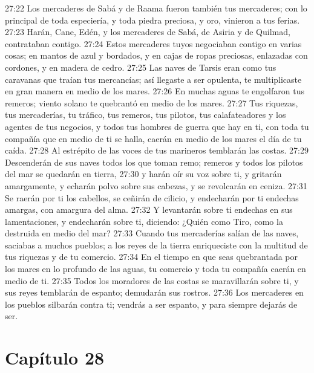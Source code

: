 27:22 Los mercaderes de Sabá y de Raama fueron también tus mercaderes; con lo principal de toda especiería, y toda piedra preciosa, y oro, vinieron a tus ferias.   
27:23 Harán, Cane, Edén, y los mercaderes de Sabá, de Asiria y de Quilmad, contrataban contigo.   
27:24 Estos mercaderes tuyos negociaban contigo en varias cosas; en mantos de azul y bordados, y en cajas de ropas preciosas, enlazadas con cordones, y en madera de cedro.   
27:25 Las naves de Tarsis eran como tus caravanas que traían tus mercancías; así llegaste a ser opulenta, te multiplicaste en gran manera en medio de los mares.   
27:26 En muchas aguas te engolfaron tus remeros; viento solano te quebrantó en medio de los mares.   
27:27 Tus riquezas, tus mercaderías, tu tráfico, tus remeros, tus pilotos, tus calafateadores y los agentes de tus negocios, y todos tus hombres de guerra que hay en ti, con toda tu compañía que en medio de ti se halla, caerán en medio de los mares el día de tu caída.   
27:28 Al estrépito de las voces de tus marineros temblarán las costas.   
27:29 Descenderán de sus naves todos los que toman remo; remeros y todos los pilotos del mar se quedarán en tierra,   
27:30 y harán oír su voz sobre ti, y gritarán amargamente, y echarán polvo sobre sus cabezas, y se revolcarán en ceniza.   
27:31 Se raerán por ti los cabellos, se ceñirán de cilicio, y endecharán por ti endechas amargas, con amargura del alma.   
27:32 Y levantarán sobre ti endechas en sus lamentaciones, y endecharán sobre ti, diciendo: ¿Quién como Tiro, como la destruida en medio del mar?   
27:33 Cuando tus mercaderías salían de las naves, saciabas a muchos pueblos; a los reyes de la tierra enriqueciste con la multitud de tus riquezas y de tu comercio.   
27:34 En el tiempo en que seas quebrantada por los mares en lo profundo de las aguas, tu comercio y toda tu compañía caerán en medio de ti.   
27:35 Todos los moradores de las costas se maravillarán sobre ti, y sus reyes temblarán de espanto; demudarán sus rostros.   
27:36 Los mercaderes en los pueblos silbarán contra ti; vendrás a ser espanto, y para siempre dejarás de ser. 
\section*{Capítulo 28 } 
  
